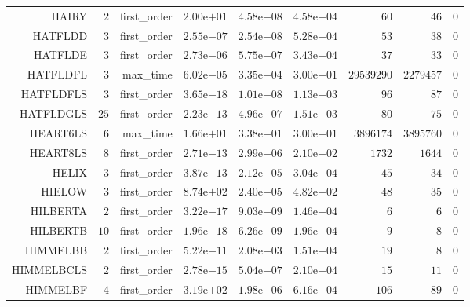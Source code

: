 \begin{longtable}{rrrrrrrrr}
HAIRY & \(     2\) & first\_order & \( 2.00\)e\(+01\) & \( 4.58\)e\(-08\) & \( 4.58\)e\(-04\) & \(    60\) & \(    46\) & \(     0\) \\
HATFLDD & \(     3\) & first\_order & \( 2.55\)e\(-07\) & \( 2.54\)e\(-08\) & \( 5.28\)e\(-04\) & \(    53\) & \(    38\) & \(     0\) \\
HATFLDE & \(     3\) & first\_order & \( 2.73\)e\(-06\) & \( 5.75\)e\(-07\) & \( 3.43\)e\(-04\) & \(    37\) & \(    33\) & \(     0\) \\
HATFLDFL & \(     3\) & max\_time & \( 6.02\)e\(-05\) & \( 3.35\)e\(-04\) & \( 3.00\)e\(+01\) & \(29539290\) & \(2279457\) & \(     0\) \\
HATFLDFLS & \(     3\) & first\_order & \( 3.65\)e\(-18\) & \( 1.01\)e\(-08\) & \( 1.13\)e\(-03\) & \(    96\) & \(    87\) & \(     0\) \\
HATFLDGLS & \(    25\) & first\_order & \( 2.23\)e\(-13\) & \( 4.96\)e\(-07\) & \( 1.51\)e\(-03\) & \(    80\) & \(    75\) & \(     0\) \\
HEART6LS & \(     6\) & max\_time & \( 1.66\)e\(+01\) & \( 3.38\)e\(-01\) & \( 3.00\)e\(+01\) & \(3896174\) & \(3895760\) & \(     0\) \\
HEART8LS & \(     8\) & first\_order & \( 2.71\)e\(-13\) & \( 2.99\)e\(-06\) & \( 2.10\)e\(-02\) & \(  1732\) & \(  1644\) & \(     0\) \\
HELIX & \(     3\) & first\_order & \( 3.87\)e\(-13\) & \( 2.12\)e\(-05\) & \( 3.04\)e\(-04\) & \(    45\) & \(    34\) & \(     0\) \\
HIELOW & \(     3\) & first\_order & \( 8.74\)e\(+02\) & \( 2.40\)e\(-05\) & \( 4.82\)e\(-02\) & \(    48\) & \(    35\) & \(     0\) \\
HILBERTA & \(     2\) & first\_order & \( 3.22\)e\(-17\) & \( 9.03\)e\(-09\) & \( 1.46\)e\(-04\) & \(     6\) & \(     6\) & \(     0\) \\
HILBERTB & \(    10\) & first\_order & \( 1.96\)e\(-18\) & \( 6.26\)e\(-09\) & \( 1.96\)e\(-04\) & \(     9\) & \(     8\) & \(     0\) \\
HIMMELBB & \(     2\) & first\_order & \( 5.22\)e\(-11\) & \( 2.08\)e\(-03\) & \( 1.51\)e\(-04\) & \(    19\) & \(     8\) & \(     0\) \\
HIMMELBCLS & \(     2\) & first\_order & \( 2.78\)e\(-15\) & \( 5.04\)e\(-07\) & \( 2.10\)e\(-04\) & \(    15\) & \(    11\) & \(     0\) \\
HIMMELBF & \(     4\) & first\_order & \( 3.19\)e\(+02\) & \( 1.98\)e\(-06\) & \( 6.16\)e\(-04\) & \(   106\) & \(    89\) & \(     0\) \\

\end{longtable}
